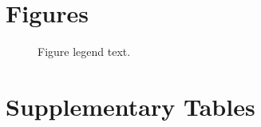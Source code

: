 \documentclass{bmcart}
\begin{document}
\begin{backmatter}

\section*{Figures}
  \begin{figure}[h!]
  \caption{}
      \end{figure}

\begin{figure}[h!]
  \caption{
      Figure legend text.}
      \end{figure}


\section*{Supplementary Tables}


\end{backmatter}
\end{document}

